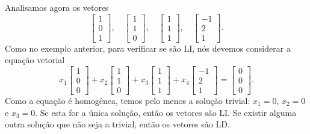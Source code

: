 \begin{ex}\label{exp:2}
Analisamos agora os vetores
\begin{equation}
\left[
  \begin{array}{c}
    1 \\
    0 \\
    1
  \end{array}
\right], \quad
\left[
  \begin{array}{c}
    1 \\
    1 \\
    0
  \end{array}
\right], \quad
\left[
  \begin{array}{c}
    1 \\
    1 \\
    1
  \end{array}
\right], \quad
\left[
  \begin{array}{c}
    -1 \\
    2 \\
    1
  \end{array}
\right].
\end{equation} Como no exemplo anterior, para verificar se são LI, nós devemos considerar a equação vetorial
\begin{equation}
x_1 \left[
  \begin{array}{c}
    1 \\
    0 \\
    0
  \end{array}
\right] +
x_2\left[
  \begin{array}{c}
    1 \\
    1 \\
    0
  \end{array}
\right] +
x_3\left[
  \begin{array}{c}
    1 \\
    1 \\
    1
  \end{array}
\right]+
x_4\left[
  \begin{array}{c}
    -1 \\
    2 \\
    1
  \end{array}
\right] =
\left[
  \begin{array}{c}
    0 \\
    0 \\
    0
  \end{array}
\right].
\end{equation} Como a equação é homogênea, temos pelo menos a solução trivial: $x_1 = 0$, $x_2=0$ e $x_3 = 0$. Se esta for a única solução, então os vetores são LI. Se existir alguma outra solução que não seja a trivial, então os vetores são LD.


\end{ex}
